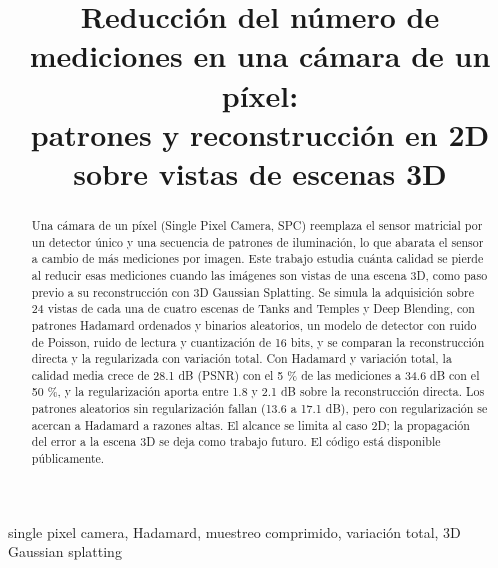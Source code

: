 \documentclass[conference]{IEEEtran}
\begin{document}
\title{Reducción del número de mediciones en una cámara de un píxel:\\
patrones y reconstrucción en 2D sobre vistas de escenas 3D}

\author{
\and
{}
}

\maketitle

\begin{abstract}
Una cámara de un píxel (Single Pixel Camera, SPC) reemplaza el sensor matricial por un detector único y una
secuencia de patrones de iluminación, lo que abarata el sensor a cambio de más mediciones por imagen. Este trabajo
estudia cuánta calidad se pierde al reducir esas mediciones cuando las imágenes son vistas de una escena 3D, como paso
previo a su reconstrucción con 3D Gaussian Splatting. Se simula la adquisición sobre 24 vistas de cada una de cuatro
escenas de Tanks and Temples y Deep Blending, con patrones Hadamard ordenados y binarios aleatorios, un modelo de
detector con ruido de Poisson, ruido de lectura y cuantización de 16 bits, y se comparan la reconstrucción directa y la
regularizada con variación total. Con Hadamard y variación total, la calidad media crece de 28.1 dB (PSNR) con el 5 \% de
las mediciones a 34.6 dB con el 50 \%, y la regularización aporta entre 1.8 y 2.1 dB sobre la reconstrucción directa. Los
patrones aleatorios sin regularización fallan (13.6 a 17.1 dB), pero con regularización se acercan a Hadamard a razones
altas. El alcance se limita al caso 2D; la propagación del error a la escena 3D se deja como trabajo futuro. El código
está disponible públicamente.
\end{abstract}

\begin{IEEEkeywords}
single pixel camera, Hadamard, muestreo comprimido, variación total, 3D Gaussian splatting
\end{IEEEkeywords}
\end{document}
